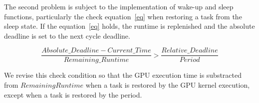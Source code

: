 The second problem is subject to the implementation of wake-up and sleep
functions, particularly the check equation~\ref{eq} when restoring a
task from the sleep state.
If the equation~\ref{eq} holds, the runtime is replenished and the
absolute deadline is set to the next cycle deadline.

{\scriptsize
\begin{equation}
\frac{Absolute\_Deadline - Current\_Time}{Remaining\_Runtime} > \frac{Relative\_Deadline}{Period} \label{eq}
\end{equation}
}

We revise this check condition so that the GPU execution time is
substracted from $Remaining Runtime$ when a task is restored by the GPU
kernel execution, except when a task is restored by the period.
